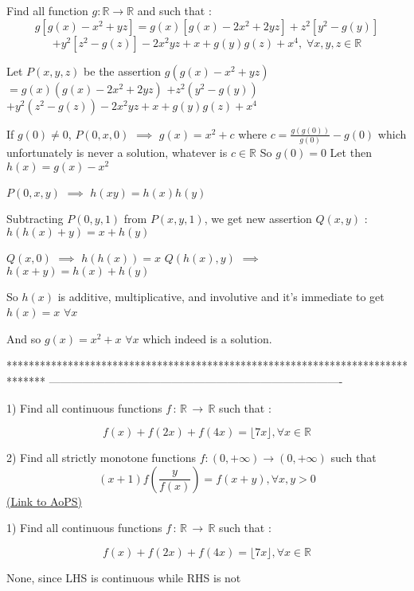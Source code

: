 \begin{solution}
	\begin{tcolorbox}Find all function $g:\mathbb{R}\rightarrow \mathbb{R}$ and such that :
\[g\left [ g(x)-x^2+yz \right ]=g(x)\left [ g(x)-2x^2+2yz \right ]+z^2\left [ y^2-g(y) \right ]\]
\[+y^2\left [ z^2-g(z) \right ]-2x^2yz+x+g(y)g(z)+x^4,\;\forall x,y,z\in \mathbb{R}\]\end{tcolorbox}
Let $P(x,y,z)$ be the assertion $g(g(x)-x^2+yz)$ $=g(x)(g(x)-2x^2+2yz)$ $+z^2(y^2-g(y))$ $+y^2(z^2-g(z))-2x^2yz+x+g(y)g(z)+x^4$

If $g(0)\ne 0$, $P(0,x,0)$ $\implies$ $g(x)=x^2+c$ where $c=\frac{g(g(0))}{g(0)}-g(0)$ which unfortunately is never a solution, whatever is $c\in\mathbb R$
So $g(0)=0$
Let then $h(x)=g(x)-x^2$

$P(0,x,y)$ $\implies$ $h(xy)=h(x)h(y)$

Subtracting $P(0,y,1)$ from $P(x,y,1)$, we get new assertion $Q(x,y)$ : $h(h(x)+y)=x+h(y)$

$Q(x,0)$ $\implies$ $h(h(x))=x$
$Q(h(x),y)$ $\implies$ $h(x+y)=h(x)+h(y)$

So $h(x)$ is additive, multiplicative, and involutive and it's immediate to get $h(x)=x$ $\forall x$

And so $\boxed{g(x)=x^2+x}$ $\forall x$ which indeed is a solution.
\end{solution}
*******************************************************************************
-------------------------------------------------------------------------------

\begin{problem}
	1) Find all continuous functions $f \, : \, \mathbb{R} \, \longrightarrow \, \mathbb{R}$ such that :

\[  f(x) + f(2x) + f(4x) = \lfloor 7x \rfloor ,\forall x \in \mathbb{R}\]

2) Find all strictly monotone functions $f:(0,+\infty)\to(0,+\infty)$ such that
\[(x+1)f(\dfrac{y}{f(x)})=f(x+y),\forall x,y>0\]
	\flushright \href{https://artofproblemsolving.com/community/c6h613727}{(Link to AoPS)}
\end{problem}



\begin{solution}
	\begin{tcolorbox}1) Find all continuous functions $f \, : \, \mathbb{R} \, \longrightarrow \, \mathbb{R}$ such that :

\[  f(x) + f(2x) + f(4x) = \lfloor 7x \rfloor ,\forall x \in \mathbb{R}\]\end{tcolorbox}
None, since LHS is continuous while RHS is not
\end{solution}



